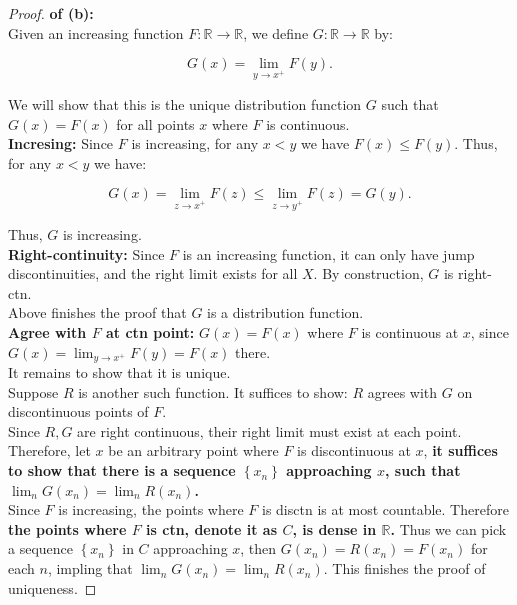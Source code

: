 \documentclass{qlnotes-export}
\begin{document}
\begin{proof}

\textbf{of (b):}\\
Given an increasing function \(F:{\mathbb{R}}\rightarrow{\mathbb{R}}\), we define \(G:{\mathbb{R}}\rightarrow{\mathbb{R}}\) by:

\[G(x) = \lim\limits_{y\rightarrow x^{+}}F(y).\]

We will show that this is the unique distribution function \(G\) such that \(G(x) = F(x)\) for all points \(x\) where \(F\) is continuous.\\
\textbf{Incresing:} Since \(F\) is increasing, for any \(x < y\) we have \(F(x) \leq F(y)\). Thus, for any \(x < y\) we have:

\[G(x) = \lim\limits_{z\rightarrow x^{+}}F(z) \leq \lim\limits_{z\rightarrow y^{+}}F(z) = G(y).\]

Thus, \(G\) is increasing.\\
\textbf{Right-continuity:} Since \(F\) is an increasing function, it can only have jump discontinuities, and the right limit exists for all \(X\). By construction, \(G\) is right-ctn.\\
Above finishes the proof that \(G\) is a distribution function.\\
\textbf{Agree with \(F\) at ctn point:} \(G(x) = F(x)\) where \(F\) is continuous at \(x\), since \(G(x) = \lim_{y\rightarrow x^{+}}F(y) = F(x)\) there.\\
It remains to show that it is unique.\\
Suppose \(R\) is another such function. It suffices to show: \(R\) agrees with \(G\) on discontinuous points of \(F\).\\
Since \(R,G\) are right continuous, their right limit must exist at each point. Therefore, let \(x\) be an arbitrary point where \(F\) is discontinuous at \(x\), \textbf{it suffices to show that there is a sequence \(\left\{ x_{n} \right\}\) approaching \(x\), such that \(\lim_{n}G(x_{n}) = \lim_{n}R(x_{n})\).}\\
Since \(F\) is increasing, the points where \(F\) is disctn is at most countable. Therefore \textbf{the points where \(F\) is ctn, denote it as \(C\), is dense in \(\mathbb{R}\).} Thus we can pick a sequence \(\left\{ x_{n} \right\}\) in \(C\) approaching \(x\), then \(G(x_{n}) = R(x_{n}) = F(x_{n})\) for each \(n\), impling that \(\lim_{n}G(x_{n}) = \lim_{n}R(x_{n})\). This finishes the proof of uniqueness.

\end{proof}
\end{document}
